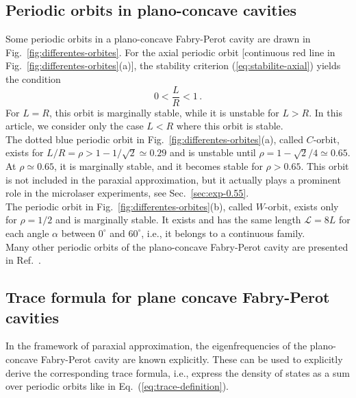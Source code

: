 \documentclass[10pt]{iopart}
\begin{document}
\subsection{Periodic orbits in plano-concave cavities}\label{sec:orbites-plano-concave}

Some periodic orbits in a plano-concave Fabry-Perot cavity are drawn in Fig.~\ref{fig:differentes-orbites}. For the axial periodic orbit [continuous red line in Fig.~\ref{fig:differentes-orbites}(a)], the stability criterion (\ref{eq:stabilite-axial}) yields the condition
\begin{equation} 0 < \frac{L}{R} < 1 \, . \end{equation}
For $L = R$, this orbit is marginally stable, while it is unstable for $L > R$. In this article, we consider only the case $L < R$ where this orbit is stable.\\

The dotted blue periodic orbit in Fig.~\ref{fig:differentes-orbites}(a), called $C$-orbit, exists for $L / R = \rho > 1 - 1 / \sqrt{2} \simeq 0.29$ and is unstable until $\rho = 1 - \sqrt{2} / 4 \simeq 0.65$. At $\rho \simeq 0.65$, it is marginally stable, and it becomes stable for $\rho > 0.65$. This orbit is not included in the paraxial approximation, but it actually plays a prominent role in the microlaser experiments, see Sec.~\ref{sec:exp-0.55}.\\

The periodic orbit in Fig.~\ref{fig:differentes-orbites}(b), called $W$-orbit, exists only for $\rho = 1 / 2$ and is marginally stable. It exists and has the same length $\mathcal{L}=8L$ for each angle $\alpha$ between $0^{\circ}$ and $60^{\circ}$, i.e., it belongs to a continuous family.\\

Many other periodic orbits of the plano-concave Fabry-Perot cavity are presented in Ref.~\cite{disque-coupe-reichl}.



\subsection{Trace formula for plane concave Fabry-Perot cavities}\label{sec:trace-plan-concave}

In the framework of paraxial approximation, the eigenfrequencies of the plano-concave Fabry-Perot cavity are known explicitly. These can be used to explicitly derive the corresponding trace formula, i.e., express the density of states as a sum over periodic orbits like in Eq.~(\ref{eq:trace-definition}).\\
\end{document}
